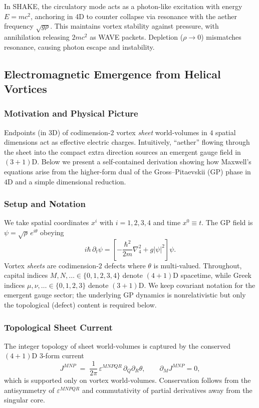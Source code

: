 In SHAKE, the circulatory mode acts as a photon-like excitation with energy $E = mc^2$, anchoring in 4D to counter collapse via resonance with the aether frequency $\sqrt{g \rho}$. This maintains vortex stability against pressure, with annihilation releasing $2mc^2$ as WAVE packets. Depletion ($\rho \to 0$) mismatches resonance, causing photon escape and instability.


\subsection{Electromagnetic Emergence from Helical Vortices}
\label{sec:EM-from-helical-vortices}

\subsubsection{Motivation and Physical Picture}
Endpoints (in 3D) of codimension-$2$ vortex \emph{sheet} world-volumes in $4$ spatial dimensions act as effective electric charges. Intuitively, ``aether'' flowing through the sheet into the compact extra direction sources an emergent gauge field in $(3{+}1)$D. Below we present a self-contained derivation showing how Maxwell's equations arise from the higher-form dual of the Gross--Pitaevskii (GP) phase in $4$D and a simple dimensional reduction.

\subsubsection{Setup and Notation}
We take spatial coordinates $x^i$ with $i=1,2,3,4$ and time $x^0\equiv t$. The GP field is $\psi=\sqrt{\rho}\,e^{i\theta}$ obeying
\begin{equation}
i\hbar\,\partial_t \psi=\left[-\frac{\hbar^2}{2m}\nabla_4^2+g|\psi|^2\right]\psi.
\end{equation}
Vortex \emph{sheets} are codimension-$2$ defects where $\theta$ is multi-valued. Throughout, capital indices $M,N,\ldots\in\{0,1,2,3,4\}$ denote $(4{+}1)$D spacetime, while Greek indices $\mu,\nu,\ldots\in\{0,1,2,3\}$ denote $(3{+}1)$D. We keep covariant notation for the emergent gauge sector; the underlying GP dynamics is nonrelativistic but only the topological (defect) content is required below.

\subsubsection{Topological Sheet Current}
The integer topology of sheet world-volumes is captured by the conserved $(4{+}1)$D 3-form current
\begin{equation}
J^{MNP} \;=\;\frac{1}{2\pi}\,\varepsilon^{MNPQR}\,\partial_Q\partial_R\theta,
\qquad \partial_M J^{MNP}=0,
\end{equation}
which is supported only on vortex world-volumes. Conservation follows from the antisymmetry of $\varepsilon^{MNPQR}$ and commutativity of partial derivatives away from the singular core.

